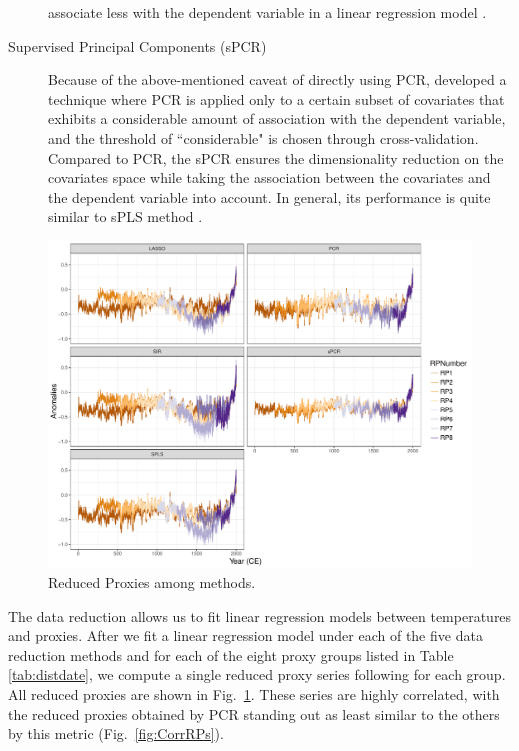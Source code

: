 \documentclass[12pt]{amsart}
\theoremstyle{plain}
\theoremstyle{definition}
\theoremstyle{remark}
\begin{document}
\begin{description}
associate less with the dependent variable in a linear regression model 
\cite{Jolliffe1982,Tibshirani1996}. 
\item[Supervised Principal Components (sPCR)]
Because of the above-mentioned caveat of directly using PCR, \cite{Bair2006} developed a technique where PCR is applied only
to a certain subset of covariates that exhibits a considerable amount of association
 with the dependent variable, and the threshold of ``considerable" is chosen through
cross-validation. Compared to PCR, the sPCR ensures the dimensionality
reduction on the covariates space while taking the association between
the covariates and the dependent variable into account. In general, its performance is quite similar to
sPLS method \cite{Chung2013}.  
\end{description}

\begin{figure}
  \centering
 \includegraphics[scale=0.38]{RPs_type} 
  \caption{Reduced Proxies among methods.}
  \label{fig:RPs}
\end{figure}

The data reduction allows us to fit linear regression models between
temperatures and proxies. After we fit a linear regression model under each of
the five data reduction methods and for each of the eight proxy groups listed in
Table \ref{tab:distdate}, we compute a single reduced proxy series following
\cite{Barboza2014} for each group. All reduced proxies are shown in Fig.~\ref{fig:RPs}.  These series are highly correlated, with the reduced proxies obtained by PCR standing out as least similar to the others by this metric (Fig.~\ref{fig:CorrRPs}).
\end{document}
